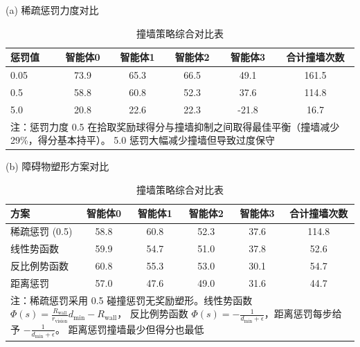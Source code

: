 \documentclass[12pt, a4paper, UTF8]{ctexart}
\numberwithin{equation}{section}
\begin{document}
\begin{table}[htbp]
  \centering
  \caption{ 撞墙策略综合对比表}
  \label{tab:appendix_wall_comprehensive}

  {(a) 稀疏惩罚力度对比}
  \vspace{4pt}

  \begin{tabular}{lccccc}
    \toprule
    惩罚值 & 智能体0 & 智能体1 & 智能体2 & 智能体3 & 合计撞墙次数 \\
    \midrule
    0.05 & 73.9 & 65.3 & 66.5 & 49.1 & 161.5 \\
    0.5  & 58.8 & 60.8 & 52.3 & 37.6 & 114.8 \\
    5.0  & 20.8 & 22.6 & 22.3 & -21.8 & 16.7 \\
    \midrule
    \multicolumn{6}{p{0.85\textwidth}}{%
      注：惩罚力度 0.5 在拾取奖励球得分与撞墙抑制之间取得最佳平衡（撞墙减少 29\%，得分基本持平）。
      5.0 惩罚大幅减少撞墙但导致过度保守} \\
  \end{tabular}

  \vspace{12pt}

  {(b) 障碍物塑形方案对比}
  \vspace{4pt}

  \begin{tabular}{lccccc}
    \toprule
    方案 & 智能体0 & 智能体1 & 智能体2 & 智能体3 & 合计撞墙次数 \\
    \midrule
    稀疏惩罚 (0.5) & 58.8 & 60.8 & 52.3 & 37.6 & 114.8 \\
    线性势函数     & 59.9 & 54.7 & 51.0 & 37.8 & 52.6  \\
    反比例势函数   & 60.8 & 55.3 & 53.0 & 30.1 & 54.7  \\
    距离惩罚       & 57.0 & 47.6 & 49.0 & 31.6 & 44.7  \\
    \midrule
    \multicolumn{6}{p{0.85\textwidth}}{%
      注：稀疏惩罚采用 0.5 碰撞惩罚无奖励塑形。线性势函数 $\Phi(s)=\frac{R_{\mathrm{wall}}}{r_{\mathrm{vision}}}d_{\min}-R_{\mathrm{wall}}$，
      反比例势函数 $\Phi(s)=-\frac{1}{d_{\min}+\epsilon}$，距离惩罚每步给予 $-\frac{1}{d_{\min}+\epsilon}$。
      距离惩罚撞墙最少但得分也最低} \\
  \end{tabular}
\end{table}
\end{document}
